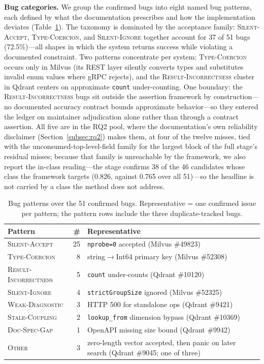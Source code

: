 \documentclass[acmsmall,screen,review,anonymous]{acmart}
\begin{document}
\textbf{Bug categories.} We group the confirmed bugs into eight named bug patterns, each defined by what the documentation prescribes and how the implementation deviates (Table~\ref{tab:bug-patterns}). The taxonomy is dominated by the acceptance family: \textsc{Silent-Accept}, \textsc{Type-Coercion}, and \textsc{Silent-Ignore} together account for 37 of 51 bugs (72.5\%)---all shapes in which the system returns success while violating a documented constraint. Two patterns concentrate per system: \textsc{Type-Coercion} occurs only in Milvus (its REST layer silently converts types and substitutes invalid enum values where gRPC rejects), and the \textsc{Result-Incorrectness} cluster in Qdrant centers on approximate \texttt{count} under-counting. One boundary: the \textsc{Result-Incorrectness} bugs sit outside the assertion framework by construction---no documented accuracy contract bounds approximate behavior---so they entered the ledger on maintainer adjudication alone rather than through a contract assertion. All five are in the RQ2 pool, where the documentation's own reliability disclaimer (Section~\ref{subsec:rq2}) makes them, at four of the twelve misses, tied with the unconsumed-top-level-field family for the largest block of the full stage's residual misses; because that family is unreachable by the framework, we also report the in-class reading---the stage confirms 38 of the 46 candidates whose class the framework targets (0.826, against 0.765 over all 51)---so the headline is not carried by a class the method does not address.

\begin{table}[t]
\caption{Bug patterns over the 51 confirmed bugs. Representative = one confirmed issue per pattern; the pattern rows include the three duplicate-tracked bugs.}
\label{tab:bug-patterns}
\small
\begin{tabular}{@{}p{}rp{}@{}}
\toprule
Pattern & \# & Representative \\
\midrule
\textsc{Silent-Accept} & 25 & \texttt{nprobe=0} accepted (Milvus \#49823) \\
\textsc{Type-Coercion} & 8 & string$\to$Int64 primary key (Milvus \#52308) \\
\textsc{Result-Incorrectness} & 5 & \texttt{count} under-counts (Qdrant \#10120) \\
\textsc{Silent-Ignore} & 4 & \texttt{strictGroupSize} ignored (Milvus \#52325) \\
\textsc{Weak-Diagnostic} & 3 & HTTP 500 for standalone ops (Qdrant \#9421) \\
\textsc{Stale-Coupling} & 2 & \texttt{lookup\_from} dimension bypass (Qdrant \#10369) \\
\textsc{Doc-Spec-Gap} & 1 & OpenAPI missing size bound (Qdrant \#9942) \\
\textsc{Other} & 3 & zero-length vector accepted, then panic on later search (Qdrant \#9045; one of three) \\
\bottomrule
\end{tabular}
\end{table}
\end{document}
